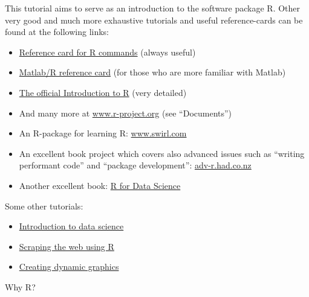 \documentclass[
]{book}
\providecommand{\tightlist}{%
  \setlength{\itemsep}{0pt}\setlength{\parskip}{0pt}}
\begin{document}
This tutorial aims to serve as an introduction to the software package R. Other very good and much more exhaustive tutorials and useful reference-cards can be found at the following links:

\begin{itemize}
\tightlist
\item
  \href{http://cran.r-project.org/doc/contrib/refcard.pdf}{Reference card for R commands} (always useful)
\item
  \href{http://www.math.umaine.edu/~hiebeler/comp/matlabR.pdf}{Matlab/R reference card} (for those who are more familiar with Matlab)
\item
  \href{https://cran.r-project.org/doc/manuals/r-release/R-intro.pdf}{The official Introduction to R} (very detailed)
\item
  And many more at \href{https://www.r-project.org/other-docs.html}{www.r-project.org} (see ``Documents'')
\item
  An R-package for learning R: \href{https://swirlstats.com/}{www.swirl.com}
\item
  An excellent book project which covers also advanced issues such as ``writing performant code'' and ``package development'': \href{http://adv-r.had.co.nz/}{adv-r.had.co.nz}\\
\item
  Another excellent book: \href{https://r4ds.had.co.nz/}{R for Data Science}
\end{itemize}

Some other tutorials:

\begin{itemize}
\tightlist
\item
  \href{https://idc9.github.io/stor390/}{Introduction to data science}
\item
  \href{https://stat4701.github.io/edav/2015/04/02/rvest_tutorial/}{Scraping the web using R}
\item
  \href{https://gganimate.com/}{Creating dynamic graphics}
\end{itemize}

Why R?
\end{document}
